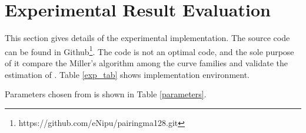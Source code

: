 \section{Experimental Result Evaluation}
This section gives details of the experimental implementation. The source code can be found in Github\footnote{\label{source}https://github.com/eNipu/pairingma128.git}. 
The code  is not an optimal code, and the sole purpose of it compare the Miller's algorithm among the curve families and validate the estimation of \cite{sylvain_new_param}.
Table \ref{exp_tab} shows implementation environment.  
\renewcommand{\baselinestretch}{1.5}
\begin{table}[!h]
\centering
\caption{Computational Environment}
\label{exp_tab}
\end{table}
\renewcommand{\baselinestretch}{1.0}
Parameters chosen from \cite{sylvain_new_param} is shown in Table \ref{parameters}.
\renewcommand{\baselinestretch}{1.5}
\begin{table}[!h]
\caption{Selected parameters for 128-bit security level \cite{sylvain_new_param}}
\label{parameters}
\begin{center}		 
\end{center}
\end{table}
